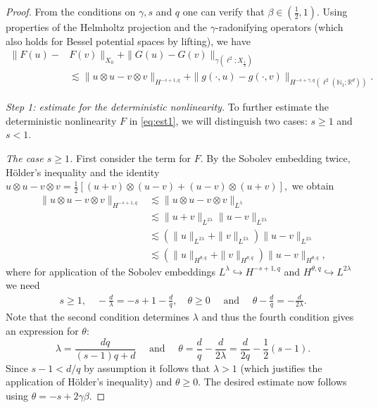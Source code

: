 \documentclass[11pt, a4paper,oneside, reqno]{amsart}
\theoremstyle{remark} %
\theoremstyle{definition} %
\numberwithin{theorem}{section}
\numberwithin{equation}{section}
\newcommand{\RR}{\mathbb{R}}
\newcommand{\NN}{\mathbb{N}}
\newcommand{\half}{\frac{1}{2}}
\newcommand{\RRd}{\RR^d}
\newcommand{\gam}{\gamma}
\begin{document}
\begin{proof}
    From the conditions on $\gam, s$ and $q$ one can verify that $\beta\in(\frac 12,1)$. Using properties of the Helmholtz projection and the $\gam$-radonifying operators \cite[Proposition 9.3.2]{HNVW17} (which also holds for Bessel potential spaces by lifting), we have
    \begin{equation}\label{eq:est1}
            \begin{aligned}
        \|F(u)-&F(v)\|_{X_0}+\|G(u)-G(v)\|_{\gam(\ell^2; X_\half)}\\
        &\lesssim \|u\otimes u-v\otimes v\|_{H^{-s+1,q}} + \|g(\cdot, u)-g(\cdot, v)\|_{H^{-s+\gam,q}(\ell^2(\NN_1; \RRd))}.
    \end{aligned}
    \end{equation}
    
    \textit{Step 1: estimate for the deterministic nonlinearity.} To further estimate the deterministic nonlinearity $F$ in \eqref{eq:est1}, we will distinguish two cases: $s\geq 1$ and $s<1$.
    
    \textit{The case $s\geq 1$.} First consider the term for $F$. By the Sobolev embedding twice, Hölder's inequality and the identity $u\otimes u-v\otimes v= \frac 12 [(u+v)\otimes (u-v)+ (u-v)\otimes (u+v)],$ we obtain
    \begin{align*}
        \|u\otimes u-v\otimes v\|_{H^{-s+1,q}}&\lesssim \|u\otimes u-v\otimes v\|_{L^\lambda}\\
        &\lesssim \|u+ v\|_{L^{2\lambda}}\|u-v\|_{L^{2\lambda}}\\
        & \lesssim(\|u\|_{L^{2\lambda}}+ \|v\|_{L^{2\lambda}})\|u-v\|_{L^{2\lambda}}\\
         &\lesssim(\|u\|_{H^{\theta,q}}+ \|v\|_{H^{\theta,q}})\|u-v\|_{H^{\theta,q}},
    \end{align*}
    where for application of the Sobolev embeddings $L^\lambda\hookrightarrow H^{-s+1,q}$ and $H^{\theta,q}\hookrightarrow L^{2\lambda}$ we need
    \begin{align}\label{eq:value_theta}
        s\geq 1, \quad-\frac{d}{\lambda}=-s+1-\frac{d}{q},\quad \theta\geq 0 \quad\text{ and }\quad \theta - \frac{d}{q} = -\frac{d}{2\lambda}.
    \end{align}
    Note that the second condition determines $\lambda$ and thus the fourth condition gives an expression for $\theta$:
    \begin{equation*}
        \lambda= \frac{dq}{(s-1)q+d}\quad \text{ and }\quad \theta = \frac{d}{q}-\frac{d}{2\lambda} = \frac{d}{2q}-\half(s-1).
    \end{equation*}
    Since $s-1< d/q$ by assumption it follows that $\lambda>1$ (which justifies the application of Hölder's inequality) and $\theta\geq 0$. The desired estimate now follows using $\theta=-s+2\gam\beta$. 


\end{proof}
\end{document}
